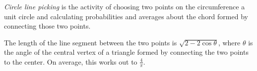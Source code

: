 \documentclass[12pt]{article}
\begin{document}
{\em Circle line picking} is the activity of choosing two points on the circumference a unit circle and calculating probabilities and averages about the chord formed by connecting those two points.

The length of the line segment between the two points is $\sqrt{2 - 2\cos\theta}$, where $\theta$ is the angle of the central vertex of a triangle formed by connecting the two points to the center. On average, this works out to $\frac{4}{\pi}$.

\end{document}
